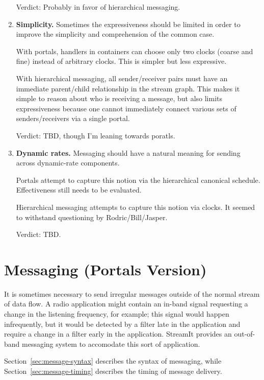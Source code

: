 \begin{enumerate}
Verdict: Probably in favor of hierarchical messaging.

\item {\bf Simplicity.}  Sometimes the expressiveness should be
limited in order to improve the simplicity and comprehension of the
common case.

With portals, handlers in containers can choose only two clocks
(coarse and fine) instead of arbitrary clocks.  This is simpler but
less expressive.

With hierarchical messaging, all sender/receiver pairs must have
an immediate parent/child relationship in the stream graph.  This
makes it simple to reason about who is receiving a message, but also
limits expressiveness because one cannot immediately connect various
sets of senders/receivers via a single portal.

Verdict: TBD, though I'm leaning towards poratls.

\item {\bf Dynamic rates.} Messaging should have a natural meaning for
sending across dynamic-rate components.

Portals attempt to capture this notion via the hierarchical canonical
schedule.  Effectiveness still needs to be evaluated.

Hierarchical messaging attempts to capture this notion via
clocks.  It seemed to withstand questioning by Rodric/Bill/Jasper.

Verdict: TBD.

\end{enumerate}

\newpage
\newcommand{\sdep}[0]{\textsc{sdep}}
\newcommand{\sdepf}[2]{\sdep_{#1 \small{\leftarrow} #2}}

\section{Messaging (Portals Version)}
\label{sec:messaging}

It is sometimes necessary to send irregular messages outside of the
normal stream of data flow.  A radio application might contain an
in-band signal requesting a change in the listening frequency, for
example; this signal would happen infrequently, but it would be
detected by a filter late in the application and require a change in a
filter early in the application.  StreamIt provides an out-of-band
messaging system to accomodate this sort of application.

Section~\ref{sec:message-syntax} describes the syntax of messaging,
while Section~\ref{sec:message-timing} describes the timing of message
delivery.

